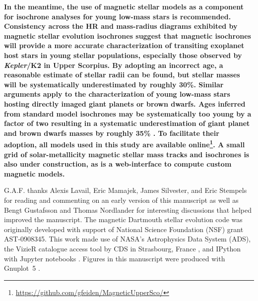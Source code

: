 \documentclass{aa}
\begin{document}
{\bf In the meantime, the use of magnetic stellar models as a component for isochrone analyses for young low-mass stars is recommended. Consistency across the HR and mass-radius diagrams exhibited by magnetic stellar evolution isochrones suggest that magnetic isochrones will provide a more accurate characterization of transiting exoplanet host stars in young stellar populations, especially those observed by \emph{Kepler}/K2 in Upper Scorpius. By adopting an incorrect age, a reasonable estimate of stellar radii can be found, but stellar masses will be systematically underestimated by roughly 30\%. Similar arguments apply to the characterization of young low-mass stars hosting directly imaged giant planets or brown dwarfs. Ages inferred from standard model isochrones may be systematically too young by a factor of two resulting in a systematic underestimation of giant planet and brown dwarfs masses by roughly 35\% \citep{Baraffe2003}. To facilitate their adoption, all models used in this study are available online\footnote{\url{https://github.com/gfeiden/MagneticUpperSco/}}. A small grid of solar-metallicity magnetic stellar mass tracks and isochrones is also under construction, as is a web-interface to compute custom magnetic models.}

\begin{acknowledgements}
G.A.F. thanks Alexis Lavail, Eric Mamajek, James Silvester, and Eric Stempels for reading and commenting on an early version of this manuscript as well as Bengt Gustafsson and Thomas Nordlander for interesting discussions that helped improved the manuscript. The magnetic Dartmouth stellar evolution code was originally developed with support of National Science Foundation (NSF) grant AST-0908345. This work made use of NASA's Astrophysics Data System (ADS), the VizieR catalogue access tool by CDS in Strasbourg, France \citep{Ochsenbein2000}, and IPython with Jupyter notebooks \citep{Perez2007}. Figures in this manuscript were produced with Gnuplot~5 \citep{Gnuplot5.0}.
\end{acknowledgements}


\end{document}
